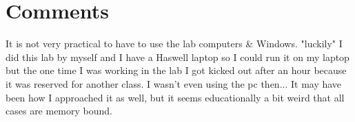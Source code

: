 \documentclass{article}
\begin{document}
\section{Comments}
It is not very practical to have to use the lab computers \& Windows. "luckily" I did this lab by myself and I have a Haswell laptop so I could run it on my laptop but the one time I was working in the lab I got kicked out after an hour because it was reserved for another class. I wasn't even using the pc then...
It may have been how I approached it as well, but it seems educationally a bit weird that all cases are memory bound.
\end{document}
